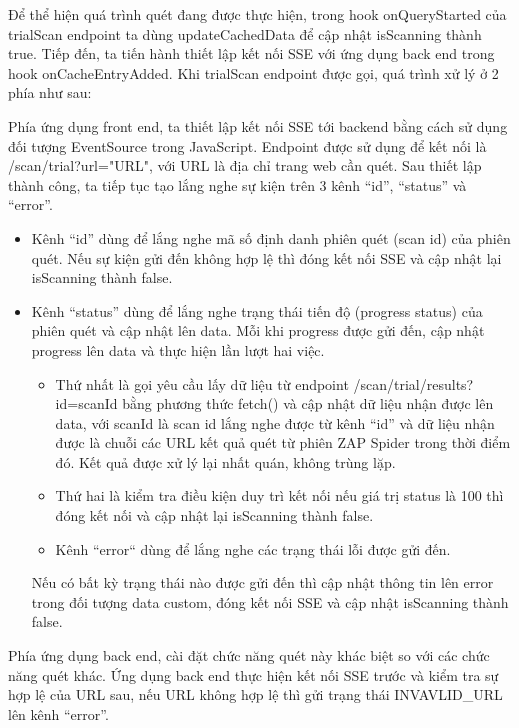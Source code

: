 Để thể hiện quá trình quét đang được thực hiện, trong hook onQueryStarted của trialScan endpoint ta dùng updateCachedData để cập nhật isScanning thành true. Tiếp đến, ta tiến hành thiết lập kết nối SSE với ứng dụng back end trong hook onCacheEntryAdded. Khi trialScan endpoint được gọi, quá trình xử lý ở 2 phía như sau:

Phía ứng dụng front end, ta thiết lập kết nối SSE tới backend bằng cách sử dụng đối tượng EventSource trong JavaScript.
Endpoint được sử dụng để kết nối là /scan/trial?url="URL", với URL là địa chỉ trang web cần quét.
Sau thiết lập thành công, ta tiếp tục tạo lắng nghe sự kiện trên 3 kênh “id”, “status” và “error”.

\begin{itemize}
  \item Kênh “id” dùng để lắng nghe mã số định danh phiên quét (scan id) của phiên quét.
        Nếu sự kiện gửi đến không hợp lệ thì đóng kết nối SSE và cập nhật lại isScanning thành false.
  \item Kênh “status” dùng để lắng nghe trạng thái tiến độ (progress status) của phiên quét và cập nhật lên data.
        Mỗi khi progress được gửi đến, cập nhật progress lên data và thực hiện lần lượt hai việc.
        \begin{itemize}
          \item Thứ nhất là gọi yêu cầu lấy dữ liệu từ endpoint /scan/trial/results?id=scanId bằng phương thức fetch() và cập nhật dữ liệu nhận được lên data, với scanId là scan id lắng nghe được từ kênh “id” và dữ liệu nhận được là chuỗi các URL kết quả quét từ phiên ZAP Spider trong thời điểm đó.
                Kết quả được xử lý lại nhất quán, không trùng lặp.
          \item Thứ hai là kiểm tra điều kiện duy trì kết nối nếu giá trị status là 100 thì đóng kết nối và cập nhật lại isScanning thành false.
          \item Kênh “error“ dùng để lắng nghe các trạng thái lỗi được gửi đến.
        \end{itemize}
        Nếu có bất kỳ trạng thái nào được gửi đến thì cập nhật thông tin lên error trong đối tượng data custom, đóng kết nối SSE và cập nhật isScanning thành false.
\end{itemize}

Phía ứng dụng back end, cài đặt chức năng quét này khác biệt so với các chức năng quét khác.
Ứng dụng back end thực hiện kết nối SSE trước và kiểm tra sự hợp lệ của URL sau, nếu URL không hợp lệ thì gửi trạng thái INVAVLID\_URL lên kênh “error”.

